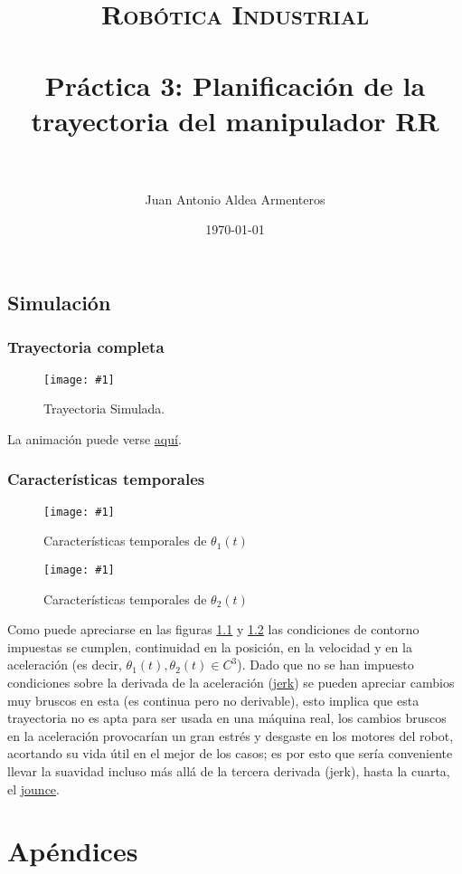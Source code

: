 \documentclass[paper=a4, fontsize=11pt]{scrreprt} %
\title{
    \normalfont \normalsize 
    \textsc{Robótica Industrial} \\ [25pt] %
    \horrule{0.5pt} \\[0.4cm] %
    \huge Práctica 3: Planificación de la trayectoria del manipulador RR \\ %
    \horrule{2pt} \\[0.5cm] %
}
\author{Juan Antonio Aldea Armenteros} %
\date{\normalsize\today}
\newlength{\imgwidth}
\newcommand\scalegraphics[1]{
    \settowidth{\imgwidth}{\texttt{[image: \#1]}}
    \setlength{\imgwidth}{\minof{\imgwidth}{\textwidth}}
    \texttt{[image: \#1]}
}
\numberwithin{equation}{section} %
\numberwithin{figure}{section} %
\numberwithin{table}{section} %
\begin{document}
    
    \maketitle %
    \chapter{Simulación}
    \section{Trayectoria completa}
        \begin{figure}[H]
            \centering
            \scalegraphics{imagenes/trayectoria.png}
            \caption{Trayectoria Simulada.}
        \end{figure}
        La animación puede verse \href{http://youtu.be/kM_YMi76RJk}{aquí}.
    \section{Características temporales}
        \begin{figure}
            \centering
            \scalegraphics{imagenes/graficos_th1.png}
            \caption{Características temporales de $\theta_1(t)$}
            \label{f:2}
        \end{figure}
        \begin{figure}
            \centering
            \scalegraphics{imagenes/graficos_th2.png}
            \caption{Características temporales de $\theta_2(t)$}
            \label{f:3}
        \end{figure}
        Como puede apreciarse en las figuras \ref{f:2} y \ref{f:3} las condiciones de contorno impuestas se cumplen, continuidad en la posición, en la velocidad y en la aceleración (es decir, $\theta_1(t), \theta_2(t) \in C^3$). Dado que no se han impuesto condiciones sobre la derivada de la aceleración (\href{http://en.wikipedia.org/wiki/Jerk_\%28physics\%29}{jerk}) se pueden apreciar cambios muy bruscos en esta (es continua pero no derivable), esto implica que esta trayectoria no es apta para ser usada en una máquina real, los cambios bruscos en la aceleración provocarían un gran estrés y desgaste en los motores del robot, acortando su vida útil en el mejor de los casos; es por esto que sería conveniente llevar la suavidad incluso más allá de la tercera derivada (jerk), hasta la cuarta, el \href{http://en.wikipedia.org/wiki/Jounce}{jounce}.
    \part*{Apéndices}
    \appendix
\end{document}
